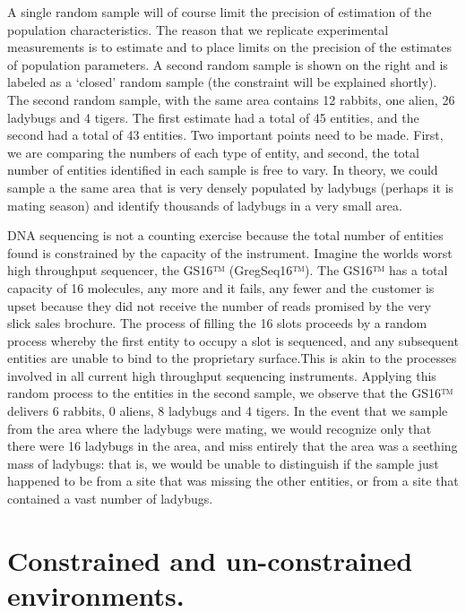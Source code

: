 \documentclass[onecolumn]{book}
\theoremstyle{definition}
\theoremstyle{definition}
\theoremstyle{definition}
\theoremstyle{remark}
\begin{document}
A single random sample will of course limit the precision of estimation
of the population characteristics. The reason that we replicate
experimental measurements is to estimate and to place limits on the
precision of the estimates of population parameters. A second random
sample is shown on the right and is labeled as a `closed' random sample
(the constraint will be explained shortly). The second random sample,
with the same area contains 12 rabbits, one alien, 26 ladybugs and 4
tigers. The first estimate had a total of 45 entities, and the second
had a total of 43 entities. Two important points need to be made. First,
we are comparing the numbers of each type of entity, and second, the
total number of entities identified in each sample is free to vary. In
theory, we could sample a the same area that is very densely populated
by ladybugs (perhaps it is mating season) and identify thousands of
ladybugs in a very small area.

DNA sequencing is not a counting exercise because the total number of
entities found is constrained by the capacity of the instrument. Imagine
the worlds worst high throughput sequencer, the GS16™ (GregSeq16™). The
GS16™ has a total capacity of 16 molecules, any more and it fails, any
fewer and the customer is upset because they did not receive the number
of reads promised by the very slick sales brochure. The process of
filling the 16 slots proceeds by a random process whereby the first
entity to occupy a slot is sequenced, and any subsequent entities are
unable to bind to the proprietary surface.This is akin to the processes
involved in all current high throughput sequencing instruments. Applying
this random process to the entities in the second sample, we observe
that the GS16™ delivers 6 rabbits, 0 aliens, 8 ladybugs and 4 tigers. In
the event that we sample from the area where the ladybugs were mating,
we would recognize only that there were 16 ladybugs in the area, and
miss entirely that the area was a seething mass of ladybugs: that is, we
would be unable to distinguish if the sample just happened to be from a
site that was missing the other entities, or from a site that contained
a vast number of ladybugs.

\hypertarget{constrained-and-un-constrained-environments.}{%
\section{Constrained and un-constrained
environments.}\label{constrained-and-un-constrained-environments.}}
\end{document}
